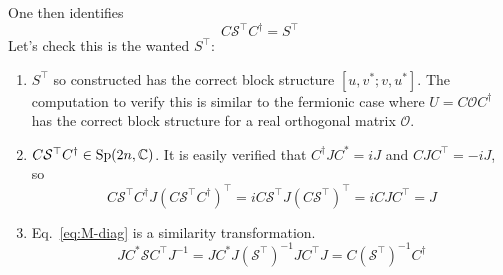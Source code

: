 One then identifies
\begin{equation}
C \mathcal{S}^{\top} C^{\dagger} = S^{\top} 
\end{equation}
Let's check this is the wanted $S^{\top}$: 
\begin{enumerate}
\item $S^{\top}$ so constructed has the correct block structure $[u, v^*; v, u^*]$. The computation to verify this is similar to the fermionic case where $U = C \mathcal{O} C^{\dagger} $ has the correct block structure for a real orthogonal matrix $\mathcal{O}$. 
\item $C \mathcal{S}^{\top} C^{\dagger}  \in {\rm Sp}(2n, \mathbb{C} )$. It is easily verified that $C^{\dagger} J C^* = iJ$ and $C J C^{\top} = - i J$, so
\begin{equation}
C\mathcal{S}^{\top} C^{\dagger} J (C\mathcal{S}^{\top} C^{\dagger})^{\top} = i C\mathcal{S}^{\top} J (C\mathcal{S}^{\top})^{\top} = i C J C^{\top} = J 
\end{equation}
\item Eq.~\eqref{eq:M-diag} is a similarity transformation. 
\begin{equation}
J C^* \mathcal{S} C^{\top} J^{-1} = J C^* J (\mathcal{S}^{\top})^{-1} J C^{\top} J = C(\mathcal{S}^{\top})^{-1}  C^{\dagger} 
\end{equation}
\end{enumerate}

